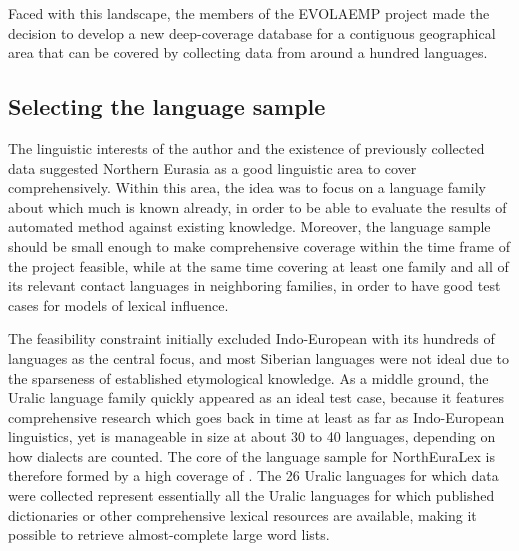 Faced with this landscape, the members of the EVOLAEMP project made the decision to develop a new deep-coverage database for a contiguous geographical area that can be covered by collecting data from around a hundred languages.

\subsection{Selecting the language sample}
The linguistic interests of the author and the existence of previously collected data suggested Northern Eurasia as a good linguistic area to cover comprehensively. Within this area, the idea was to focus on a language family about which much is known already, in order to be able to evaluate the results of automated method against existing knowledge. Moreover, the language sample should be small enough to make comprehensive coverage within the time frame of the project feasible, while at the same time covering at least one family and all of its relevant contact languages in neighboring families, in order to have good test cases for models of lexical influence.

The feasibility constraint initially excluded Indo-European with its hundreds of languages as the central focus, and most Siberian languages were not ideal due to the sparseness of established etymological knowledge. As a middle ground, the Uralic language family quickly appeared as an ideal test case, because it features comprehensive research which goes back in time at least as far as Indo-European linguistics, yet is manageable in size at about 30 to 40 languages, depending on how dialects are counted. The core of the language sample for NorthEuraLex is therefore formed by a high coverage of . The 26 Uralic languages for which data were collected represent essentially all the Uralic languages for which published dictionaries or other comprehensive lexical resources are available, making it possible to retrieve almost-complete large word lists.

